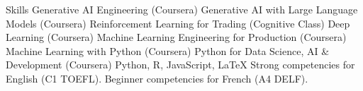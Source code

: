 
\begin{rubric}{Skills}
	Generative AI Engineering (Coursera)
	Generative AI with Large Language Models (Coursera)
\entry*[]
        Reinforcement Learning for Trading (Cognitive Class)
\entry*[]
        Deep Learning (Coursera)
\entry*[]
        Machine Learning Engineering for Production (Coursera)
\entry*[]
        Machine Learning with Python (Coursera)
\entry*[]
        Python for Data Science, AI \& Development (Coursera)
	Python, R, JavaScript, \LaTeX
\entry*[Languages]
	Strong competencies for English (C1 TOEFL).
\entry*[]
	Beginner competencies for French (A4 DELF).

\end{rubric}
